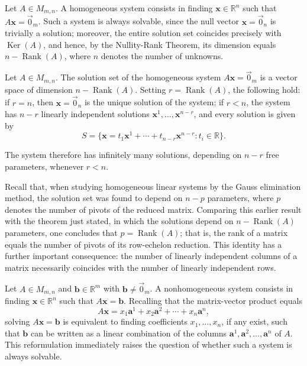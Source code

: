Let $A \in M_{m,n}$. A homogeneous system consists in finding $\mathbf{x} \in \mathbb{R}^n$ such that $A\mathbf{x} = \vec{0}_m$. Such a system is always solvable, since the null vector $\mathbf{x} = \vec{0}_n$ is trivially a solution; moreover, the entire solution set coincides precisely with $\operatorname{Ker}(A)$, and hence, by the Nullity-Rank Theorem, its dimension equals $n - \operatorname{Rank}(A)$, where $n$ denotes the number of unknowns.

\begin{theorem}
Let $A \in M_{m,n}$. The solution set of the homogeneous system $A\mathbf{x} = \vec{0}_m$ is a vector space of dimension $n - \operatorname{Rank}(A)$. Setting $r = \operatorname{Rank}(A)$, the following hold: if $r = n$, then $\mathbf{x} = \vec{0}_n$ is the unique solution of the system; if $r < n$, the system has $n-r$ linearly independent solutions $\mathbf{x}^1, \dots, \mathbf{x}^{n-r}$, and every solution is given by
\[
S = \{ \mathbf{x} = t_1 \mathbf{x}^1 + \cdots + t_{n-r} \mathbf{x}^{n-r} : t_i \in \mathbb{R} \}.
\]

The system therefore has infinitely many solutions, depending on $n-r$ free parameters, whenever $r < n$.
\end{theorem}

\begin{remark}
Recall that, when studying homogeneous linear systems by the Gauss elimination method, the solution set was found to depend on $n-p$ parameters, where $p$ denotes the number of pivots of the reduced matrix. Comparing this earlier result with the theorem just stated, in which the solutions depend on $n - \operatorname{Rank}(A)$ parameters, one concludes that $p = \operatorname{Rank}(A)$; that is, the rank of a matrix equals the number of pivots of its row-echelon reduction. This identity has a further important consequence: the number of linearly independent columns of a matrix necessarily coincides with the number of linearly independent rows.
\end{remark}

Let $A \in M_{m,n}$ and $\mathbf{b} \in \mathbb{R}^m$ with $\mathbf{b} \neq \vec{0}_m$. A nonhomogeneous system consists in finding $\mathbf{x} \in \mathbb{R}^n$ such that $A\mathbf{x} = \mathbf{b}$. Recalling that the matrix-vector product equals
\[
A\mathbf{x} = x_1 \mathbf{a}^1 + x_2 \mathbf{a}^2 + \cdots + x_n \mathbf{a}^n,
\] solving $A\mathbf{x} = \mathbf{b}$ is equivalent to finding coefficients $x_1, \dots, x_n$, if any exist, such that $\mathbf{b}$ can be written as a linear combination of the columns $\mathbf{a}^1, \mathbf{a}^2, \dots, \mathbf{a}^n$ of $A$. This reformulation immediately raises the question of whether such a system is always solvable.

